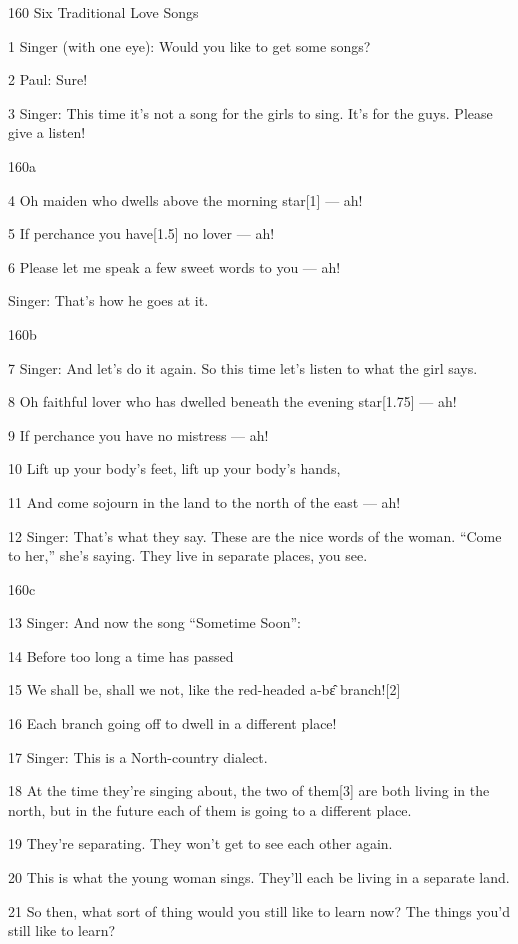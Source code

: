 
{160 Six Traditional Love Songs}

{1 Singer (with one eye): Would you like to get some songs?}

{2 Paul: Sure!}

{3 Singer: This time it's not a song for the girls to sing. It's for the
guys. Please give a listen!}

{160a}

{4 Oh maiden who dwells above the morning star[1] --- ah!}

{5 If perchance you have[1.5] no lover --- ah!}

{6 Please let me speak a few sweet words to you --- ah!}

{Singer: That's how he goes at it.}

{160b}

{7 Singer: And let's do it again. So this time let's listen to what the
girl says.}

{8 Oh faithful lover who has dwelled beneath the evening star[1.75] ---
ah!}

{9 If perchance you have no mistress --- ah!}

{10 Lift up your body's feet, lift up your body's hands,}

{11 And come sojourn in the land to the north of the east --- ah!}

{12 Singer: That's what they say. These are the nice words of the woman.
``Come to her,'' she's saying. They live in separate places, you see.}

{160c}

{13 Singer: And now the song ``Sometime Soon'':}

{14 Before too long a time has passed}

{15 We shall be, shall we not, like the red-headed a-bɛ̂ branch![2]}

{16 Each branch going off to dwell in a different place!}

{17 Singer: This is a North-country dialect.}

{18 At the time they're singing about, the two of them[3] are both living
in the north, but in the future each of them is going to a different place.}

{19 They're separating. They won't get to see each other again.}

{20 This is what the young woman sings. They'll each be living in a separate
land.}

{21 So then, what sort of thing would you still like to learn now? The things
you'd still like to learn?}

